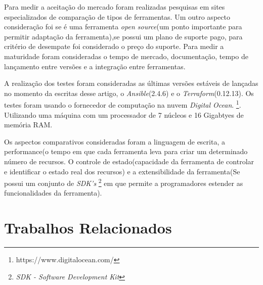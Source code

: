 Para medir a aceitação do mercado foram realizadas pesquisas em sites especializados de comparação de tipos de ferramentas. Um outro aspecto consideração foi se é uma ferramenta \textit{open source}(um ponto importante para permitir adaptação da ferramenta),se possui um plano de suporte pago, para critério de desempate foi considerado o preço do suporte. Para medir a maturidade foram consideradas o tempo de mercado, documentação, tempo de lançamento entre versões e a integração entre ferramentas.

A realização dos testes foram consideradas as últimas versões estáveis de lançadas no momento da escritas desse artigo, o \textit{Ansible}(2.4.6) e o \textit{Terraform}(0.12.13). Os testes foram usando o fornecedor de computação na nuvem  \textit{Digital Ocean}. \footnote{https://www.digitalocean.com/}. Utilizando uma máquina com um processador de 7 núcleos e 16 Gigabtyes de memória RAM.   

Os aspectos comparativos consideradas foram a linguagem de escrita, a performance(o tempo em que cada ferramenta leva para criar um determinado número de recursos. O controle de estado(capacidade da ferramenta  de controlar e identificar o estado real dos recursos) e a extensibilidade da ferramenta(Se possui um conjunto de \textit{SDK's} \footnote{\textit{SDK - Software Development Kit}} em que permite a programadores estender as funcionalidades da ferramenta).  


\section{\esp Trabalhos Relacionados} \label{relacionados}



